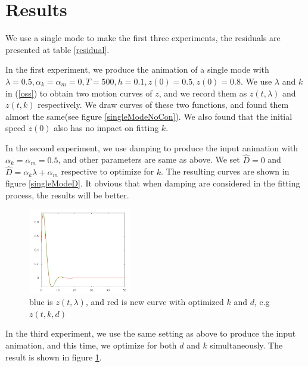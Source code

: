 \documentclass[twocolumn,a4paper]{article}
\begin{document}
\section{Results}
We use a single mode to make the first three experiments, the residuals are
presented at table \ref{residual}.

In the first experiment, we produce the animation of a single mode with
$\lambda=0.5,\alpha_k=\alpha_m=0,T=500,h=0.1,z(0)=0.5,\dot{z}(0)=0.8$. We use
$\lambda$ and $k$ in (\ref{oss}) to obtain two motion curves of $z$, and we
record them as $z(t,\lambda)$ and $z(t,k)$ respectively. We draw curves of these
two functions, and found them almost the same(see figure
\ref{singleModeNoCon}). We also found that the initial speed $\dot{z}(0)$ also
has no impact on fitting $k$.

In the second experiment, we use damping to produce the input animation with
$\alpha_k=\alpha_m=0.5$, and other parameters are same as above. We set
$\hat{D}=0$ and $\hat{D} = \alpha_k\lambda+\alpha_m$ respective to optimize for
$k$. The resulting curves are shown in figure \ref{singleModeD}. It obvious that
when damping are considered in the fitting process, the results will be better.
\begin{figure}
  \centering
  \includegraphics[width=0.4\textwidth]{./figures/singleModeKD.png}
  \caption{blue is $z(t,\lambda)$, and red is new curve with optimized $k$ and
    $d$, e.g $z(t,k,d)$}
  \label{singleModeKD}
\end{figure}

In the third experiment, we use the same setting as above to produce the input
animation, and this time, we optimize for both $d$ and $k$ simultaneously. The
result is shown in figure \ref{singleModeKD}. 
\end{document}
